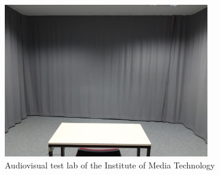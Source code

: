 \begin{figure}[h]
    \centering
    \includegraphics[width=0.8\textwidth]{./images/fig2.jpeg}
    \caption{Audiovisual test lab of the Institute of Media Technology}
    \label{fig:fig2}
\end{figure}

